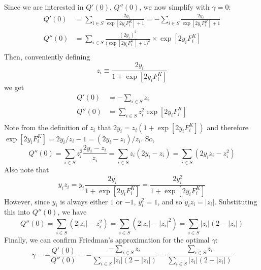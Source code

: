 \documentclass{article}
\begin{document}
Since we are interested in $Q'(0)$, $Q''(0)$, we now simplify with
$\gamma=0$:
\begin{equation*}
\begin{split}
Q'(0) &= \sum_{i \in S} \frac{ -2 y_i } { \exp [ 2 y_i F_i^K ] + 1 } = - \sum_{i \in S} \frac{ 2 y_i } { \exp [ 2 y_i F_i^K ] + 1 } \\
Q''(0) &= \sum_{i \in S} \frac{ (2 y_i)^2 } { \bigg( \exp [ 2 y_i F_i^K ] + 1 \bigg)^2 } \times \exp [ 2 y_i F_i^K ] \\
\end{split}
\end{equation*}
Then, conveniently defining
\begin{equation*}
z_i \equiv \frac{ 2 y_i } { 1 + \exp [ 2 y_i F_i^K ] }
\end{equation*}
we get
\begin{equation*}
\begin{split}
Q'(0) &= - \sum_{i \in S} z_i \\
Q''(0) &= \sum_{i \in S} z_i^2 \exp [ 2 y_i F_i^K ] \\
\end{split}
\end{equation*}
Note from the definition of $z_i$ that $2 y_i = z_i ( 1 + \exp [ 2 y_i
  F_i^K ] )$ and therefore $\exp [ 2 y_i F_i^K ] = 2y_i/z_i - 1 =
(2y_i - z_i)/z_i$.  So,
\begin{equation*}
Q''(0) = \sum_{i \in S} z_i^2 \frac{ 2 y_i - z_i }{ z_i } = \sum_{i \in S} z_i ( 2 y_i - z_i ) = \sum_{i \in S} ( 2 y_i z_i - z_i^2 )
\end{equation*}
Also note that
\begin{equation*}
y_i z_i = y_i \frac{ 2 y_i } { 1 + \exp [ 2 y_i F_i^K ] } = \frac{ 2 y_i^2 } { 1 + \exp [ 2 y_i F_i^K ] }
\end{equation*}
However, since $y_i$ is always either $1$ or $-1$, $y_i^2 = 1$, and so
$y_i z_i = | z_i |$.  Substituting this into $Q''(0)$, we have
\begin{equation*}
Q''(0) = \sum_{i \in S} ( 2 | z_i | - z_i^2 ) = \sum_{i \in S} ( 2 | z_i | - | z_i | ^2 ) = \sum_{i \in S} | z_i | ( 2 - | z_i | )
\end{equation*}
Finally, we can confirm Friedman's approximation for the optimal $\gamma$:
\begin{equation*}
\hat \gamma
  = - \frac{ Q'(0) }{ Q''(0) }
  = - \frac{ - \sum_{i \in S} z_i }{ \sum_{i \in S} | z_i | ( 2 - | z_i | ) }
  = \frac{ \sum_{i \in S} z_i }{ \sum_{i \in S} | z_i | ( 2 - | z_i | ) }
\end{equation*}
\end{document}
